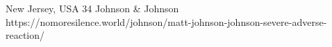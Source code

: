           {New Jersey, USA}
          {34}
          {Johnson \& Johnson}
          {}
          {
          }
          {https://nomoresilence.world/johnson/matt-johnson-johnson-severe-adverse-reaction/}


